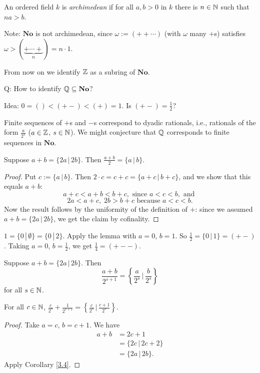 An ordered field $k$ is {\em archimedean} if for all $a,b>0$ in $k$ there is $n\in\mathbb{N}$ such that $na>b$.

Note: $\mathbf{No}$ is not archimedean, since $\omega := (++\cdots)$ (with $\omega$ many $+$s) satisfies $\omega>(\underbrace{+\cdots + }_{n})=n\cdot 1$.

From now on we identify $\mathbb{Z}$ as a subring of $\mathbf{No}$.

Q: How to identify $\mathbb{Q}\subseteq \mathbf{No}$?

Idea: $0 = () < (+-) < (+) = 1$. Is $(+-)=\tfrac12$?

Finite sequences of $+$s and $-$s correspond to dyadic rationals, i.e., rationals of the form $\frac{a}{2^s}$ ($a\in\mathbb{Z}$, $s\in\mathbb{N}$). We might conjecture that $\mathbb{Q}$ corresponds to finite sequences in $\mathbf{No}$.

\begin{lemma}
Suppose $a+b = \{2a \,|\, 2b \}$. Then $\frac{a+b}2 = \{a \,|\, b \}$.
\end{lemma}

\begin{proof}
Put $c := \{a \,|\, b\}$. Then $2\cdot c = c+ c = \{a+c \,|\, b+c \}$, and we show that this equals $a+b$:
\[ a+c < a+b < b+c, \text{ since } a< c < b, \text{ and } \]
\[ 2a < a+c, \; 2b > b+c \text{ because } a<c < b. \]
Now the result follows by the uniformity of the definition of $+$: since we assumed $a+b = \{2a \,|\, 2b \}$, we get the claim by cofinality.
\end{proof}

\begin{example}
$1 = \{ 0 \,|\, \emptyset \} = \{ 0 \,|\, 2 \}$. Apply the lemma with $a=0$, $b=1$.
So $\tfrac12 = \{0 \,|\, 1 \} = (+-)$. Taking $a=0$, $b=\tfrac12$, we get $\tfrac14 = (+--)$.
\end{example}

\begin{cor} %
Suppose $a + b = \{ 2a \,|\, 2b \}$. Then 
\[ \frac{a+b}{2^{s+1}} = \left\{ \frac{a}{2^s} \,\bigg|\, \frac{b}{2^s} \right\}  \]
for all $s\in\mathbb{N}$.
\label{3.4}
\end{cor}

\begin{cor} %
For all $c\in\mathbb{N}$, $\frac{c}{2^s} + \frac{1}{2^{s+1}} = \left\{ \frac{c}{2^s} \,|\, \frac{c+1}{2^s} \right\}$.
\label{3.5}
\end{cor}

\begin{proof} %
Take $a=c$, $b=c+1$. We have
\begin{align*}
a+b &= 2c+1 \\
&= \{ 2c \,|\, 2c+2 \} \\
&= \{ 2a \,|\, 2b \}.
\end{align*}
Apply Corollary \ref{3.4}.
\end{proof}

